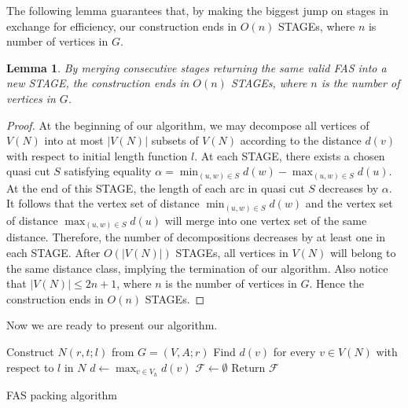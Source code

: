 \documentclass[11pt]{article}
\newtheorem{lemma}[theorem]{Lemma}
\begin{document}
The following lemma guarantees that, by making the biggest jump on stages in exchange for efficiency, our construction ends in $O(n)$ STAGEs, where $n$ is number of vertices in $G$.

\begin{lemma}
\label{lem:5}
By merging consecutive stages returning the same valid FAS into a new STAGE, the construction ends in $O(n)$ STAGEs, where $n$ is the number of vertices in $G$.
\end{lemma}
\begin{proof}
At the beginning of our algorithm, we may decompose all vertices of $V(N)$ into at most $\lvert V(N)\rvert$ subsets of $V(N)$ according to the distance $d(v)$ with respect to initial length function $l$. At each STAGE, there exists a chosen quasi cut $S$ satisfying equality $\alpha=\min_{(u,w)\in S} d(w)-\max_{(u,w)\in S} d(u)$. At the end of this STAGE, the length of each arc in quasi cut $S$ decreases by $\alpha$. It follows that the vertex set of distance $\min_{(u,w)\in S} d(w)$ and the vertex set of distance $\max_{(u,w)\in S} d(u)$ will merge into one vertex set of the same distance. Therefore, the number of decompositions decreases by at least one in each STAGE. After $O(\lvert V(N)\rvert)$ STAGEs, all vertices in $V(N)$ will belong to the same distance class, implying the termination of our algorithm. Also notice that $\lvert V(N)\rvert\leq 2n+1$, where $n$ is the number of vertices in $G$. Hence the construction ends in $O(n)$ STAGEs.
\end{proof}
Now we are ready to present our algorithm. 
\SetAlFnt{\small}
\begin{algorithm}[!ht]
  \SetAlgoLined
  \SetAlgoNoEnd
  \BlankLine
  Construct $N(r,t;l)$ from $G=(V,A;r)$\;
  Find $d(v)$ for every $v\in V(N)$ with respect to $l$ in $N$\; %
  $d\leftarrow \max_{v\in V_h}d(v)$\;
  $\mathcal{F}\leftarrow \emptyset$\;
  Return $\mathcal{F}$\;
  \BlankLine
  \caption{FAS packing algorithm}
\end{algorithm} 
\end{document}
